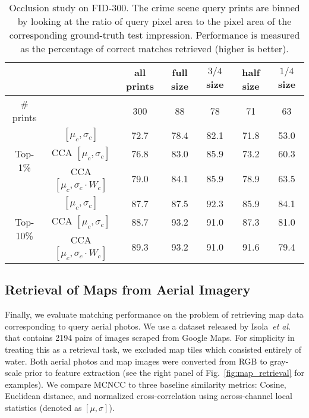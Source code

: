 \documentclass[twocolumn]{svjour3}           %
\newcommand{\etal}{\emph{et al.}}
\begin{document}
\begin{table*}[t]
\begin{center}
\begin{tabular}{c|c|c|c|c|c|c}
  & & all prints & full size & $3/4$ size & half size & $1/4$ size \\
  \hline
  \# prints & & 300 & 88 & 78 & 71 & 63 \\
  \hline
  \multirow{3}{*}{Top-1\%} & $[\mu_c,\sigma_c]$ & 72.7 & 78.4 & 82.1 & 71.8 & 53.0 \\
  & CCA $[\mu_c,\sigma_c]$ & 76.8 & 83.0 & 85.9 & 73.2 & 60.3 \\
  & CCA $[\mu_c,\sigma_c\cdot W_c]$ & 79.0 & 84.1 & 85.9 & 78.9 & 63.5 \\
  \hline
  \multirow{3}{*}{Top-10\%} & $[\mu_c,\sigma_c]$ & 87.7 & 87.5 & 92.3 & 85.9 & 84.1 \\
  & CCA $[\mu_c,\sigma_c]$ & 88.7 & 93.2 & 91.0 & 87.3 & 81.0 \\
  & CCA $[\mu_c,\sigma_c\cdot W_c]$ & 89.3 & 93.2 & 91.0 & 91.6 & 79.4
\end{tabular}
\end{center}
\caption{Occlusion study on FID-300. The crime scene query prints are binned by
looking at the ratio of query pixel area to the pixel area of the corresponding
ground-truth test impression. Performance is measured as the percentage of
correct matches retrieved (higher is better).}
\label{tab:basel_ablation}
\end{table*}

\subsection{Retrieval of Maps from Aerial Imagery}
Finally, we evaluate matching performance on the problem of retrieving map data
corresponding to query aerial photos.  We use a dataset released by
Isola~\etal~\cite{isola2017image} that contains 2194 pairs of images scraped
from Google Maps. For simplicity in treating this as a retrieval task, we
excluded map tiles which consisted entirely of water.  Both aerial photos and
map images were converted from RGB to gray-scale prior to feature extraction
(see the right panel of Fig.~\ref{fig:map_retrieval} for examples).  We compare MCNCC to
three baseline similarity metrics: Cosine, Euclidean distance, and normalized
cross-correlation using across-channel local statistics (denoted as $[\mu,\sigma]$).
\end{document}

